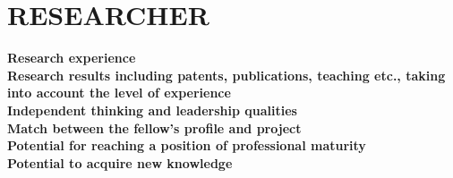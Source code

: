 \section{RESEARCHER} %
\label{sec:researcher}
\textbf{Research experience} \\
\textbf{Research results including patents, publications, teaching etc., taking into account the level 
of experience} \\
\textbf{Independent thinking and leadership qualities} \\
\textbf{Match between the fellow's profile and project} \\
\textbf{Potential for reaching a position of professional maturity} \\
\textbf{Potential to acquire new knowledge} \\
\newpage
